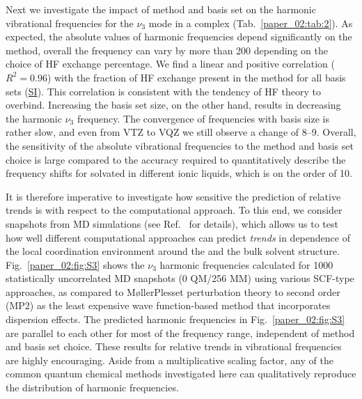 \documentclass[%
  class = book,%
  crop = false,%
  float = true,%
  multi = true,%
  preview = false,%
]{standalone}
\begin{document}
Next we investigate the impact of method and basis set on the harmonic vibrational frequencies for the \(\nu_{3}\) mode in a \cotil{} complex (Tab.~\ref{paper_02:tab:2}). As expected, the absolute values of harmonic frequencies depend significantly on the method, overall the frequency can vary by more than \SI{200}{\wavenumber} depending on the choice of HF exchange percentage. We find a linear and positive correlation (\(R^{2} = 0.96\)) with the fraction of HF exchange present in the method for all basis sets (\hyperref[paper_02:sec:SI]{SI}). This correlation is consistent with the tendency of HF theory to overbind. Increasing the basis set size, on the other hand, results in decreasing the harmonic  \(\nu_{3}\) frequency. The convergence of frequencies with basis size is rather slow, and even from VTZ to VQZ we still observe a change of \SIrange{8}{9}{\wavenumber}. Overall, the sensitivity of the absolute vibrational frequencies to the method and basis set choice is large compared to the accuracy required to quantitatively describe the frequency shifts for  solvated in different ionic liquids, which is on the order of \SI{10}{\wavenumber}.

It is therefore imperative to investigate how sensitive the prediction of relative trends is with respect to the computational approach. To this end, we consider snapshots from MD simulations (see Ref.~\parencite{Daly2016} for details), which allows us to test how well different computational approaches can predict \emph{trends} in dependence of the local coordination environment around the  and the bulk solvent structure. Fig.~\ref{paper_02:fig:S3} shows the  \(\nu_{3}\) harmonic frequencies calculated for \num{1000} statistically uncorrelated MD snapshots (0 QM/256 MM) using various SCF-type approaches, as compared to M\o{}ller\textendash{}Plesset perturbation theory to second order (MP2) as the least expensive wave function-based method that incorporates dispersion effects.\cite{WCMS:WCMS58} The predicted harmonic frequencies in Fig.~\ref{paper_02:fig:S3} are parallel to each other for most of the frequency range, independent of method and basis set choice. These results for relative trends in vibrational frequencies are highly encouraging. Aside from a multiplicative scaling factor, any of the common quantum chemical methods investigated here can qualitatively reproduce the distribution of harmonic frequencies.
\end{document}
